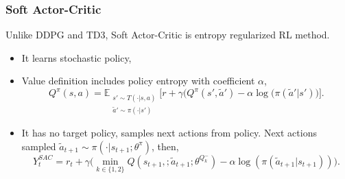 \documentclass{beamer}
\begin{document}

\begin{frame}
\frametitle{Soft Actor-Critic}
Unlike DDPG and TD3, Soft Actor-Critic is entropy regularized RL method. 
\begin{itemize}
	\item It learns stochastic policy,
	\item Value definition includes policy entropy with coefficient $\alpha$, 
	\begin{equation}
	\label{eqn:q_dfn_entreg}
	Q^{\pi}(s,a) = \mathbb{E}_{\substack{s'\sim T(\cdot|s,a)\\\widetilde{a}'\sim \pi(\cdot|s')} } \Big[r + \gamma \Big(Q^{\pi}(s',\widetilde{a}') -\alpha\log(\pi(\widetilde{a}'|s') \Big) \Big]. %
	\end{equation}
	\item It has no target policy, samples next actions from policy. Next actions sampled $\widetilde{a}_{t+1} \sim \pi(\cdot|s_{t+1}; \theta^{\pi})$, then, 
	\begin{equation}
	\label{eqn:q_target_sac}
	Y_t^{SAC} = r_t + \gamma \Big(\min_{k\in\{1,2\}} Q(s_{t+1}, ;\widetilde{a}_{t+1};\theta^{Q_k^-}) -\alpha\log(\pi(\widetilde{a}_{t+1}|s_{t+1})) \Big).
	\end{equation}
\end{itemize} 
\end{frame}
\end{document}
